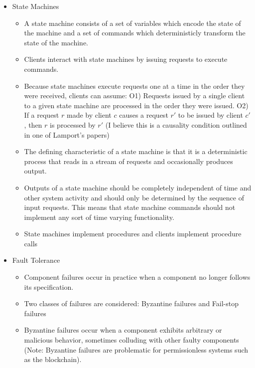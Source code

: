 \documentclass[a4paper]{article}
\begin{document}
\begin{itemize}
\item State Machines
\begin{itemize}
\item A state machine consists of a set of variables which encode the state of the machine and a set of commands which deterministicly transform the state of the machine.

\item Clients interact with state machines by issuing requests to execute commands.

\item Because state machines execute requests one at a time in the order they were received, clients can assume: O1) Requests issued by a single client to a given state machine are processed in the order they were issued. O2) If a request $r$ made by client $c$ causes a request $r'$ to be issued by client $c'$, then $r$ is processed by $r'$ (I believe this is a causality condition outlined in one of Lamport's papers)

\item The defining characteristic of a state machine is that it is a deterministic process that reads in a stream of requests and occasionally produces output.

\item Outputs of a state machine should be completely independent of time and other system activity and should only be determined by the sequence of input requests. This means that state machine commands should not implement any sort of time varying functionality.

\item State machines implement procedures and clients implement procedure calls
\end{itemize}

\item Fault Tolerance
\begin{itemize}

\item Component failures occur in practice when a component no longer follows its specification.

\item Two classes of failures are considered: Byzantine failures and Fail-stop failures

\item Byzantine failures occur when a component exhibits arbitrary or malicious behavior, sometimes colluding with other faulty components (Note: Byzantine failures are problematic for permissionless systems such as the blockchain).


\end{itemize}
\end{itemize}
\end{document}
